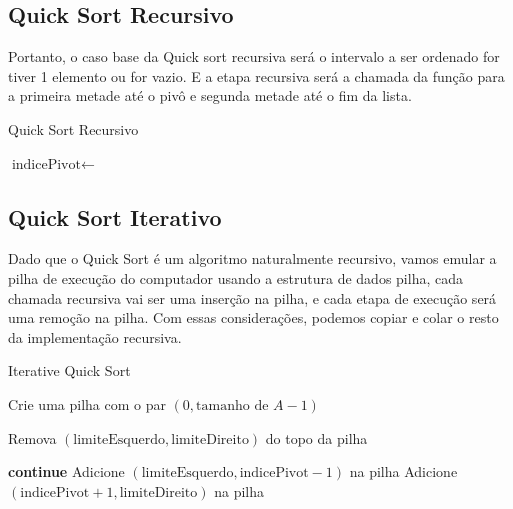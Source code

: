 \subsection{Quick Sort Recursivo}

Portanto, o caso base da Quick sort recursiva será o intervalo a ser ordenado for tiver 1 elemento ou for vazio. E a etapa recursiva será a chamada da função para a primeira metade até o pivô e segunda metade até o fim da lista.

\begin{algorithm}
	\caption{Quick Sort Recursivo}
	\label{algo:rec_quick_sort}
	\begin{algorithmic}[1]
		\Return
		\EndIf
		\State $\text{indicePivot} \gets$ 
		\State {}
		\State {}
		\Statex
		\EndFunction
	\end{algorithmic}
\end{algorithm}
\FloatBarrier

\subsection{Quick Sort Iterativo}

Dado que o Quick Sort é um algoritmo naturalmente recursivo, vamos emular a pilha de execução do computador usando a estrutura de dados pilha, cada chamada recursiva vai ser uma inserção na pilha, e cada etapa de execução será uma remoção na pilha. Com essas considerações, podemos copiar e colar o resto da implementação recursiva.

\begin{algorithm}
	\caption{Iterative Quick Sort}
	\label{algo:iterative_quick_sort}
	\begin{algorithmic}[1]
		\Statex

		\State \Return
		\EndIf
		\State Crie uma pilha com o par $(0, \text{tamanho de } A - 1)$

		\State Remova $(\text{limiteEsquerdo}, \text{limiteDireito})$ do topo da pilha

		\State \textbf{continue}
		\EndIf
		\State Adicione $(\text{limiteEsquerdo}, \text{indicePivot} - 1)$ na pilha 
		\State Adicione $(\text{indicePivot} + 1, \text{limiteDireito})$ na pilha 
		\EndWhile
		\EndFunction
	\end{algorithmic}
\end{algorithm}
\FloatBarrier
\newpage

